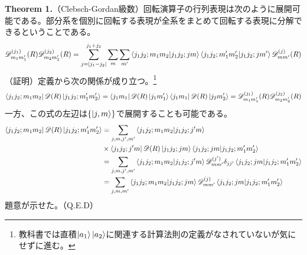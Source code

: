 \documentclass[dvipdfmx]{jarticle}
\theoremstyle{plain}
\begin{document}
\begin{enumerate}
        \textbf{Theorem 1.}（Clebsch-Gordan級数）回転演算子の行列表現は次のように展開可能である。部分系を個別に回転する表現が全系をまとめて回転する表現に分解できるということである。
        \begin{align}
          \mathscr{D}_{m_1m_1'}^{(j_1)}(R)\mathscr{D}_{m_2m_2'}^{(j_2)}(R) = \sum_{j = \qty|j_1 - j_2|}^{j_1 + j_2}\sum_m \sum_{m'}\bra{j_1j_2;m_1m_2}\ket{j_1j_2;jm}\bra{j_1j_2;m_1'm_2'}\ket{j_1j_2;jm'}\mathscr{D}_{mm'}^{(j)}(R)
        \end{align}
            （証明）定義から次の関係が成り立つ。\footnote{教科書では直積$\ket{a_1}\ket{a_2}$に関連する計算法則の定義がなされていないが気にせずに進む。}
            \begin{align}
              \bra{j_1j_2;m_1m_2}\mathscr{D}(R)\ket{j_1j_2;m'_1m'_2} = \bra{j_1m_1}\mathscr{D}(R)\ket{j_1m_1'}\bra{j_1m_1}\mathscr{D}(R)\ket{j_2m_2'} = \mathscr{D}_{m_1m_1'}^{(j_1)}(R)\mathscr{D}_{m_2m_2'}^{(j_2)}(R)
            \end{align}
            一方、この式の左辺は$\qty{\ket{j,m}}$で展開することも可能である。
            \begin{align}
              \bra{j_1j_2;m_1m_2}\mathscr{D}(R)\ket{j_1j_2;m'_1m'_2} &= \sum_{j, m, j', m'}\bra{j_1j_2;m_1m_2}\ket{j_1j_2;j'm}\\
              &\times\bra{j_1j_2;j'm}\mathscr{D}(R)\ket{j_1j_2;jm}\bra{j_1j_2;jm}\ket{j_1j_2;m'_1m'_2}\\
              &=\sum_{j, m, j', m'}\bra{j_1j_2;m_1m_2}\ket{j_1j_2;j'm}\mathscr{D}^{(j')}_{mm'}\delta_{jj'}\bra{j_1j_2;jm}\ket{j_1j_2;m'_1m'_2} \\
              &=\sum_{j, m, m'}\bra{j_1j_2;m_1m_2}\ket{j_1j_2;jm}\mathscr{D}^{(j)}_{mm'}\bra{j_1j_2;jm}\ket{j_1j_2;m'_1m'_2}
            \end{align}
            題意が示せた。\hfill （Q.E.D）
\end{enumerate}
\end{document}
